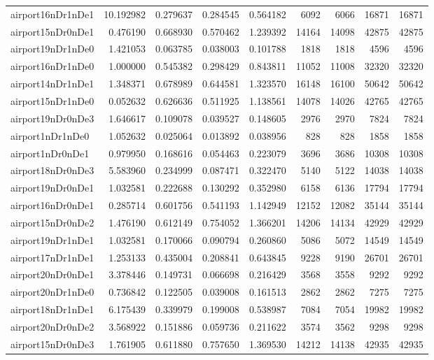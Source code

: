 \begin{longtable}{|l|r|r|r|r|r|r|r|r|}
airport16nDr1nDe1 & 10.192982 & 0.279637 & 0.284545 & 0.564182 & 6092 & 6066 & 16871 & 16871 \\
airport15nDr0nDe1 & 0.476190 & 0.668930 & 0.570462 & 1.239392 & 14164 & 14098 & 42875 & 42875 \\
airport19nDr1nDe0 & 1.421053 & 0.063785 & 0.038003 & 0.101788 & 1818 & 1818 & 4596 & 4596 \\
airport16nDr1nDe0 & 1.000000 & 0.545382 & 0.298429 & 0.843811 & 11052 & 11008 & 32320 & 32320 \\
airport14nDr1nDe1 & 1.348371 & 0.678989 & 0.644581 & 1.323570 & 16148 & 16100 & 50642 & 50642 \\
airport15nDr1nDe0 & 0.052632 & 0.626636 & 0.511925 & 1.138561 & 14078 & 14026 & 42765 & 42765 \\
airport19nDr0nDe3 & 1.646617 & 0.109078 & 0.039527 & 0.148605 & 2976 & 2970 & 7824 & 7824 \\
airport1nDr1nDe0 & 1.052632 & 0.025064 & 0.013892 & 0.038956 & 828 & 828 & 1858 & 1858 \\
airport1nDr0nDe1 & 0.979950 & 0.168616 & 0.054463 & 0.223079 & 3696 & 3686 & 10308 & 10308 \\
airport18nDr0nDe3 & 5.583960 & 0.234999 & 0.087471 & 0.322470 & 5140 & 5122 & 14038 & 14038 \\
airport19nDr0nDe1 & 1.032581 & 0.222688 & 0.130292 & 0.352980 & 6158 & 6136 & 17794 & 17794 \\
airport16nDr0nDe1 & 0.285714 & 0.601756 & 0.541193 & 1.142949 & 12152 & 12082 & 35144 & 35144 \\
airport15nDr0nDe2 & 1.476190 & 0.612149 & 0.754052 & 1.366201 & 14206 & 14134 & 42929 & 42929 \\
airport19nDr1nDe1 & 1.032581 & 0.170066 & 0.090794 & 0.260860 & 5086 & 5072 & 14549 & 14549 \\
airport17nDr1nDe1 & 1.253133 & 0.435004 & 0.208841 & 0.643845 & 9228 & 9190 & 26701 & 26701 \\
airport20nDr0nDe1 & 3.378446 & 0.149731 & 0.066698 & 0.216429 & 3568 & 3558 & 9292 & 9292 \\
airport20nDr1nDe0 & 0.736842 & 0.122505 & 0.039008 & 0.161513 & 2862 & 2862 & 7275 & 7275 \\
airport18nDr1nDe1 & 6.175439 & 0.339979 & 0.199008 & 0.538987 & 7084 & 7054 & 19982 & 19982 \\
airport20nDr0nDe2 & 3.568922 & 0.151886 & 0.059736 & 0.211622 & 3574 & 3562 & 9298 & 9298 \\
airport15nDr0nDe3 & 1.761905 & 0.611880 & 0.757650 & 1.369530 & 14212 & 14138 & 42935 & 42935 \\

\end{longtable}
